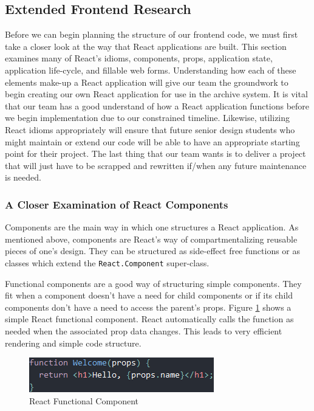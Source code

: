 \documentclass[12pt]{report}
\begin{document}
\subsection*{Extended Frontend Research}

Before we can begin planning the structure of our frontend code, we must first take a closer look at the way that React applications are built. This section examines many of React's idioms, components, props, application state, application life-cycle, and fillable web forms. Understanding how each of these elements make-up a React application will give our team the groundwork to begin creating our own React application for use in the archive system. It is vital that our team has a good understand of how a React application functions before we begin implementation due to our constrained timeline. Likewise, utilizing React idioms appropriately will ensure that future senior design students who might maintain or extend our code will be able to have an appropriate starting point for their project. The last thing that our team wants is to deliver a project that will just have to be scrapped and rewritten if/when any future maintenance is needed.

\subsubsection*{A Closer Examination of React Components}

Components are the main way in which one structures a React application. As mentioned above, components are React's way of compartmentalizing reusable pieces of one's design. They can be structured as side-effect free functions or as classes which extend the \texttt{React.Component} super-class.

Functional components are a good way of structuring simple components. They fit when a component doesn't have a need for child components or if its child components don't have a need to access the parent's props. Figure \ref{fig:reactfunctionalcomponent} shows a simple React functional component.\cite{reactcomponentsandprops} React automatically calls the function as needed when the associated prop data changes. This leads to very efficient rendering and simple code structure.

\begin{figure}[h]
	\centering
	\includegraphics[scale=0.5]{react_functional_component}
	\caption{React Functional Component}
	\label{fig:reactfunctionalcomponent}
\end{figure}
\end{document}

